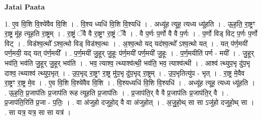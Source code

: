 \documentclass[17pt]{extarticle}
\begin{document}
\textbf{Jatai Paata} \newline

1. ए॒व वि॒शि वि॒श्ये॑वैव वि॒शि । . वि॒श्य ध्यधि॑ वि॒शि वि॒श्यधि॑ । . अध्यू॑ह त्यूह॒ त्यध्य ध्यू॑हति । . ऊ॒ह॒ति॒ रा॒ष्ट्रꣳ रा॒ष्ट्र मू॑ह त्यूहति रा॒ष्ट्रम् । . रा॒ष्ट्रं ॅवै वै रा॒ष्ट्रꣳ रा॒ष्ट्रं ॅवै । . वै प॒र्णः प॒र्णो वै वै प॒र्णः । . प॒र्णो विड् विट् प॒र्णः प॒र्णो विट् । . विड॑श्व॒त्थो᳚ ऽश्व॒त्थो विड् विड॑श्व॒त्थः । . अ॒श्व॒त्थो यद् यद॑श्व॒त्थो᳚ ऽश्व॒त्थो यत् । . यत् प॑र्ण॒मयी॑ पर्ण॒मयी॒ यद् यत् प॑र्ण॒मयी᳚ । . प॒र्ण॒मयी॑ जु॒हूर् जु॒हूः प॑र्ण॒मयी॑ पर्ण॒मयी॑ जु॒हूः । . प॒र्ण॒मयीति॑ पर्ण - मयी᳚ । . जु॒हूर् भव॑ति॒ भव॑ति जु॒हूर् जु॒हूर् भव॑ति । . भव॒ त्याश्व॒ त्थ्याश्व॑त्थी॒ भव॑ति॒ भव॒ त्याश्व॑त्थी । . आश्व॑ त्थ्युप॒भृ दु॑प॒भृ दाश्व॒ त्थ्याश्व॑ त्थ्युप॒भृत् । . उ॒प॒भृद् रा॒ष्ट्रꣳ रा॒ष्ट्र मु॑प॒भृ दु॑प॒भृद् रा॒ष्ट्रम् । . उ॒प॒भृतित्यु॑प - भृत् । . रा॒ष्ट्र मे॒वैव रा॒ष्ट्रꣳ रा॒ष्ट्र मे॒व । . ए॒व वि॒शि वि॒श्ये॑वैव वि॒शि । . वि॒श्यध्यधि॑ वि॒शि वि॒श्यधि॑ । . अध्यू॑ह त्यूह॒ त्यध्य ध्यू॑हति । . ऊ॒ह॒ति॒ प्र॒जाप॑तिः प्र॒जाप॑ति रूह त्यूहति प्र॒जाप॑तिः । . प्र॒जाप॑ति॒र् वै वै प्र॒जाप॑तिः प्र॒जाप॑ति॒र् वै । . प्र॒जाप॑ति॒रिति॑ प्र॒जा - प॒तिः॒ । . वा अ॑जुहो दजुहो॒द् वै वा अ॑जुहोत् । . अ॒जु॒हो॒थ् सा सा ऽजु॑हो दजुहो॒थ् सा । . सा यत्र॒ यत्र॒ सा सा यत्र॑ । \newline
\end{document}

